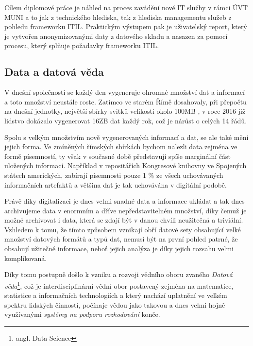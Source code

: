 \documentclass[
  digital,     %
  twoside,     %
  lof,         %
  lot,         %
]{fithesis4}
\begin{document}
Cílem diplomové práce je náhled na proces zavádění nové IT služby v rámci ÚVT MUNI a to jak z technického hlediska, tak z hlediska managementu služeb z pohledu frameworku ITIL. Praktickým výstupem pak je uživatelský report, který je vytvořen anonymizovanými daty z datového skladu a nasazen za pomocí procesu, který splňuje požadavky frameworku ITIL.

\subsection{Data a datová věda}
V dnešní společnosti se každý den vygeneruje ohromné množství dat a informací a toto množství neustále roste. Zatímco ve starém Římě dosahovaly, při přepočtu na dnešní jednotky, největší sbírky svitků velikosti okolo 100MB \parencite[p.~157]{Smil2021}, v roce 2016 již lidstvo dokázalo vygenerovat 16ZB dat každý rok\parencite[p.~160]{Smil2021}, což je nárůst o celých 14 řádů.

Spolu s velkým množstvím nově vygenerovaných informací a dat, se ale také mění jejich forma. Ve zmíněných římských sbírkách bychom nalezli data zejména ve formě písemností, ty však v současné době představují spíše marginální část uložených informací. Například v repositářích Kongresové knihovny ve Spojených státech amerických, zabírají písemnosti pouze 1 \% ze všech uchovávaných informačních artefaktů \parencite[p.~158]{Smil2021} a většina dat je tak uchovávána v digitální podobě.

Právě díky digitalizaci je dnes velmi snadné data a informace ukládat a tak dnes archivujeme data v enormním a dříve nepředstavitelném množství, díky čemuž je možné archivovat i data, která se zdají být v danou chvíli neužitečná a triviální. Vzhledem k tomu, že tímto způsobem vznikají obří datové sety obsahující velké množství datových formátů a typů dat, nemusí být na první pohled patrné, že obsahují užitečné informace, neboť jejich analýza je díky jejich rozsahu velmi komplikovaná.

Díky tomu postupně došlo k vzniku a rozvoji vědního oboru zvaného \emph{Datová věda}\footnote{angl. Data Science}, což je interdisciplinární vědní obor postavený zejména na matematice, statistice a informačních technologiích a který nachází uplatnění ve velkém spektru lidských činností, počínaje vědou jako takovou a dnes velmi hojně využívanými \emph{systémy na podporu rozhodování} konče.
\end{document}

